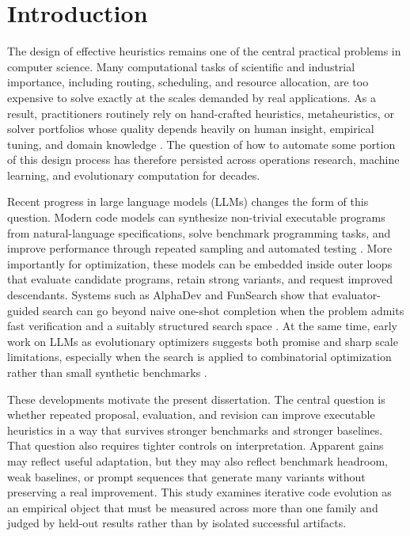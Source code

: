 \chapter{Introduction}
\label{chap:introduction}

The design of effective heuristics remains one of the central practical problems in computer
science. Many computational tasks of scientific and industrial importance, including routing,
scheduling, and resource allocation, are too expensive to solve exactly at the scales demanded by
real applications. As a result, practitioners routinely rely on hand-crafted heuristics,
metaheuristics, or solver portfolios whose quality depends heavily on human insight, empirical
tuning, and domain knowledge \cite{rice1976,bengio2021mlco,burke2013,dokeroglu2024}. The
question of how to automate some portion of this design process has therefore persisted across
operations research, machine learning, and evolutionary computation for decades.

Recent progress in large language models (LLMs) changes the form of this question. Modern code
models can synthesize non-trivial executable programs from natural-language specifications, solve
benchmark programming tasks, and improve performance through repeated sampling and automated
testing \cite{chen2021codex,austin2021program,li2022alphacode,zan2023nl2code,jiang2024codesurvey,jain2024livecodebench}.
More importantly for optimization, these models can be embedded inside outer loops that evaluate
candidate programs, retain strong variants, and request improved descendants. Systems such as
AlphaDev and FunSearch show that evaluator-guided search can go beyond naive one-shot completion
when the problem admits fast verification and a suitably structured search space
\cite{mankowitz2023alphadev,romeraparedes2024funsearch}. At the same time, early work on LLMs as
evolutionary optimizers suggests both promise and sharp scale limitations, especially when the
search is applied to combinatorial optimization rather than small synthetic benchmarks
\cite{liu2023lmea,daros2025llmco}.

These developments motivate the present dissertation. The central question is whether repeated
proposal, evaluation, and revision can improve executable heuristics in a way that survives
stronger benchmarks and stronger baselines. That question also requires tighter controls on
interpretation. Apparent gains may
reflect useful adaptation, but they may also reflect benchmark headroom, weak baselines, or prompt
sequences that generate many variants without preserving a real improvement. This study examines
iterative code evolution as an empirical object that must be measured across more than one
family and judged by held-out results rather than by isolated successful artifacts.


